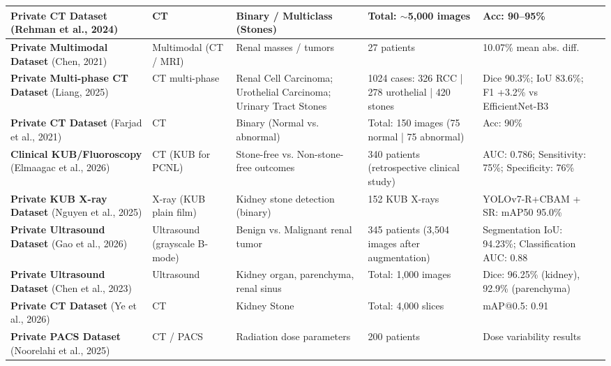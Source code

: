 \begin{longtable}{|L{2.8cm}|L{1.8cm}|L{2.5cm}|L{3.0cm}|L{3.6cm}|L{2.2cm}|}
\textbf{Private CT Dataset} \newline (Rehman et al., 2024) & CT & Binary / Multiclass (Stones) & Total: $\sim$5,000 images & Acc: 90–95\% & \cite{rehman2024kidney} \\
\hline
\textbf{Private Multimodal Dataset} \newline (Chen, 2021) & Multimodal (CT / MRI) & Renal masses / tumors & 27 patients & 10.07\% mean abs. diff. & \cite{chen2021rapid} \\
\hline
\textbf{Private Multi-phase CT Dataset} \newline (Liang, 2025) & CT multi-phase & Renal Cell Carcinoma; Urothelial Carcinoma; Urinary Tract Stones & 1024 cases: 326 RCC | 278 urothelial | 420 stones & Dice 90.3\%; IoU 83.6\%; F1 +3.2\% vs EfficientNet-B3 & \cite{liang2025multicenter} \\
\hline
\textbf{Private CT Dataset} \newline (Farjad et al., 2021) & CT & Binary (Normal vs. abnormal) & Total: 150 images (75 normal | 75 abnormal) & Acc: 90\% & \cite{farjad2021ct} \\
\hline
\textbf{Clinical KUB/Fluoroscopy} \newline (Elmaagac et al., 2026) & CT (KUB for PCNL) & Stone-free vs. Non-stone-free outcomes & 340 patients (retrospective clinical study) & AUC: 0.786; Sensitivity: 75\%; Specificity: 76\% & \cite{elmaagac2026comparison} \\
\hline
\textbf{Private KUB X-ray Dataset} \newline (Nguyen et al., 2025) & X-ray (KUB plain film) & Kidney stone detection (binary) & 152 KUB X-rays & YOLOv7-R+CBAM + SR: mAP50 95.0\% & \cite{nguyen2025super} \\
\hline
\textbf{Private Ultrasound Dataset} \newline (Gao et al., 2026) & Ultrasound (grayscale B-mode) & Benign vs. Malignant renal tumor & 345 patients (3,504 images after augmentation) & Segmentation IoU: 94.23\%; Classification AUC: 0.88 & \cite{gao2026multitask} \\
\hline
\textbf{Private Ultrasound Dataset} \newline (Chen et al., 2023) & Ultrasound & Kidney organ, parenchyma, renal sinus & Total: 1,000 images & Dice: 96.25\% (kidney), 92.9\% (parenchyma) & \cite{chen2023glunet} \\
\hline
\textbf{Private CT Dataset} \newline (Ye et al., 2026) & CT & Kidney Stone & Total: 4,000 slices & mAP@0.5: 0.91 & \cite{ye2026automated} \\
\hline
\textbf{Private PACS Dataset} \newline (Noorelahi et al., 2025) & CT / PACS & Radiation dose parameters & 200 patients & Dose variability results & \cite{noorelahi2025pacs} \\
\hline


\end{longtable}
